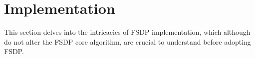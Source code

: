 \section{Implementation}\label{sec:implementation}

This section delves into the intricacies of FSDP implementation, which although do not alter the FSDP core algorithm, are crucial to understand before adopting FSDP. 






























